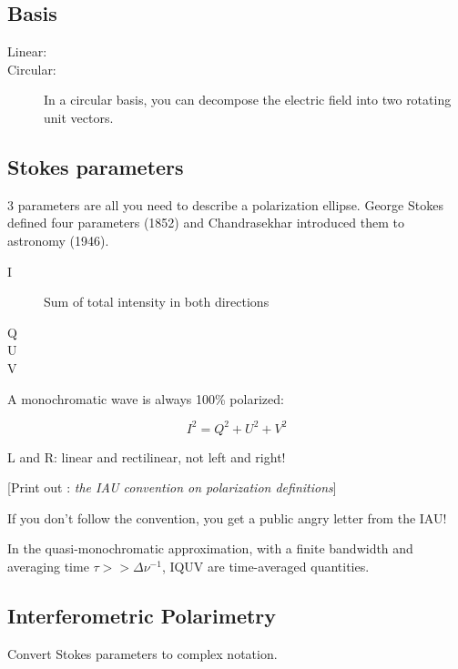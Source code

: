 \documentclass[a4paper]{article}
\newcommand{\Comment}[2]{ [{\color{red}\sc #1 :} {{\color{cyan} \it #2}}]}
\begin{document}
\subsection{Basis}

\begin{description}

\item[Linear:]

\item[Circular:] In a circular basis,
you can decompose the electric field into two rotating unit vectors. 

\end{description}

\subsection{Stokes parameters}

3 parameters are all you need to describe a polarization ellipse.
George Stokes defined four parameters (1852) and Chandrasekhar introduced them to astronomy (1946). 

\begin{description}

\item[I] Sum of total intensity in both directions
\item[Q] 
\item[U] 
\item[V]

\end{description}

A monochromatic wave is always 100\% polarized:

$$ I^2 = Q^2 + U^2 + V^2 $$

L and R: linear and rectilinear, not left and right! 

\Comment{Print out}{the IAU convention on polarization definitions}

If you don't follow the convention, you get a public angry letter from the IAU! 

In the quasi-monochromatic approximation, with a finite bandwidth and averaging time $ \tau >> \Delta \nu^{-1} $, IQUV are time-averaged quantities. 

\subsection{Interferometric Polarimetry}

Convert Stokes parameters to complex notation. 
\end{document}
